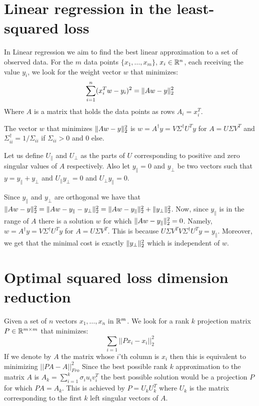 \documentclass{article}
\begin{document}
\section{Linear regression in the least-squared loss}
In Linear regression we aim to find the best linear approximation 
to a set of observed data. For the $m$ data  points $\{x_1,\ldots,x_m\}$,  $x_i \in {\mathbb{R}}^n$,
each receiving the value $y_i$, we look for the weight vector $w$ that minimizes:
\[
\sum_{i=1}^{n} (x_{i}^{T}w - y_i)^2 = \| Aw - y \|_{2}^{2}
\]
Where $A$ is a matrix that holds the data points as rows $A_i = x^{T}_{i}$.

\begin{proposition}
The vector $w$ that minimizes $\| Aw - y \|_{2}^{2}$ is $w = A^{\dagger}y = V\Sigma^{\dagger}U^{T}y$
for $A = U\Sigma V^T$ and $\Sigma^{\dagger}_{ii} = 1/\Sigma_{ii}$ if $\Sigma_{ii} > 0$ and $0$ else. 
\end{proposition}

Let us define $U_{\parallel}$ and $U_{\perp}$ as the parts of $U$ corresponding to positive and zero singular values of $A$ respectively. 
Also let $y_{\parallel} = 0$ and $y_{\perp}$ be two vectors such that $y = y_{\parallel}+y_{\perp}$ and 
$U_{\parallel}y_{\perp} = 0$ and $U_{\perp}y_{\parallel}=0$.

Since $y_{\parallel}$ and $y_{\perp}$ are orthogonal we have that  $\| Aw - y \|_{2}^{2}
= \| Aw - y_{\parallel}-y_{\perp} \|_{2}^{2} = \| Aw - y_{\parallel} \|_{2}^{2} + \| y_{\perp} \|_{2}^{2}$.
Now, since $y_{\parallel}$ is in the range of $A$ there is a solution $w$ for which $\| Aw - y_{\parallel} \|_{2}^{2} = 0$.
Namely, $w = A^{\dagger}y = V\Sigma^{\dagger}U^{T}y$ for $A = U\Sigma V^{T}$. This is because $U\Sigma V^{T}V\Sigma^{\dagger}U^{T}y = y_{\parallel}$.
Moreover, we get that the minimal cost is exactly $ \| y_{\perp} \|_{2}^{2}$ which is independent of $w$.


\section{Optimal squared loss dimension reduction}

Given a set of $n$ vectors $x_1,\ldots,x_n$ in ${\mathbb{R}}^{m}$. We look for a rank $k$ 
projection matrix $P \in {\mathbb{R}}^{m \times m}$ that minimizes:
\[
\sum_{i=1} ||Px_{i} - x_{i}||_{2}^{2}
\]
If we denote by $A$ the matrix whose $i$'th column is $x_i$ then this is equivalent to minimizing $||PA - A||_{Fro}^{2}$
Since the best possible rank $k$ approximation to the matrix $A$ is $A_{k} = \sum_{i=1}^{k}\sigma_{i}u_{i}v_{i}^{T}$ the best
possible solution would be a projection $P$ for which $PA = A_{k}$. This is achieved by $P = U_{k}U_{k}^{T}$ where $U_{k}$
is the matrix corresponding to the first $k$ left singular vectors of $A$. 
\end{document}
